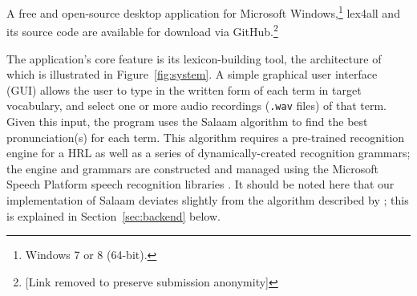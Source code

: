 \documentclass[11pt]{article}
\begin{document}
A free and open-source desktop application for Microsoft Windows,\footnote{Windows 7 or 8 (64-bit).} lex4all and its source code are available for download via GitHub.\footnote{[Link removed to preserve submission anonymity]}


The application's core feature is its lexicon-building tool, the architecture of which is illustrated in Figure~\ref{fig:system}.
A simple graphical user interface (GUI) allows the user to type in the written form of each term in target vocabulary, and select one or more audio recordings (\texttt{.wav} files) of that term.
Given this input, the program uses the Salaam algorithm \cite{Qiao10,Chan12} to find the best pronunciation(s) for each term. This algorithm requires a pre-trained recognition engine for a HRL 
as well as a series of dynamically-created recognition grammars; the engine and grammars are constructed and managed using the Microsoft Speech Platform speech recognition libraries \cite{mspsdk}.
It should be noted here that 
our implementation of Salaam deviates slightly from the algorithm described by ; this is explained in Section~\ref{sec:backend} below. 
\end{document}
